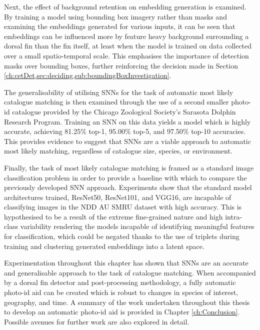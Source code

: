 Next, the effect of background retention on embedding generation is examined. By training a model using bounding box imagery rather than masks and examining the embeddings generated for various inputs, it can be seen that embeddings can be influenced more by feature heavy background surrounding a dorsal fin than the fin itself, at least when the model is trained on data collected over a small spatio-temporal scale. This emphasises the importance of detection masks over bounding boxes, further reinforcing the decision made in Section \ref{ch:cetDet,sec:deciding,sub:boundingBoxInvestigation}.

The generalisability of utilising SNNs for the task of automatic most likely catalogue matching is then examined through the use of a second smaller photo-id catalogue provided by the Chicago Zoological Society's Sarasota Dolphin Research Program. Training an SNN on this data yields a model which is highly accurate, achieving 81.25\% top-1, 95.00\% top-5, and 97.50\% top-10 accuracies. This provides evidence to suggest that SNNs are a viable approach to automatic most likely matching, regardless of catalogue size, species, or environment.

Finally, the task of most likely catalogue matching is framed as a standard image classification problem in order to provide a baseline with which to compare the previously developed SNN approach. Experiments show that the standard model architectures trained, ResNet50, ResNet101, and VGG16, are incapable of classifying images in the NDD AU SMRU dataset with high accuracy. This is hypothesised to be a result of the extreme fine-grained nature and high intra-class variability rendering the models incapable of identifying meaningful features for classification, which could be negated thanks to the use of triplets during training and clustering generated embeddings into a latent space.

Experimentation throughout this chapter has shown that SNNs are an accurate and generalisable approach to the task of catalogue matching. When accompanied by a dorsal fin detector and post-processing methodology, a fully automatic photo-id aid can be created which is robust to changes in species of interest, geography, and time. A summary of the work undertaken throughout this thesis to develop an automatic photo-id aid is provided in Chapter \ref{ch:Conclusion}. Possible avenues for further work are also explored in detail.
